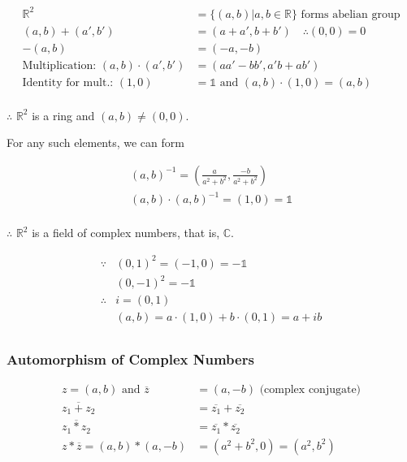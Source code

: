 \documentclass{article}
\begin{document}
    \begin{align*}
        \mathbb{R}^{2} &= \{ (a, b) | a, b \in \mathbb{R} \} \text{ forms abelian group} \\
        (a, b) + (a', b') &= (a + a', b + b') \quad \therefore (0, 0) = 0 \\
        -(a, b) &= (-a, -b) \\
        \text{Multiplication: } (a, b) \cdot (a', b') &= (aa' - bb', a'b + ab') \\
        \text{Identity for mult.: } (1, 0) &= \mathds{1} \text{ and } (a, b) \cdot (1, 0) = (a, b) \\
    \end{align*}
    
    $\therefore$ $\mathbb{R}^{2}$ is a ring and $(a, b) \neq (0, 0)$.
    
    For any such elements, we can form
    
    \begin{align*}
        (a, b)^{-1} = (\frac{a}{a^{2} + b^{2}}, \frac{-b}{a^{2} + b^{2}}) \\
        (a, b) \cdot (a, b)^{-1} = (1, 0) = \mathds{1} \\
    \end{align*}
    
    $\therefore$ $\mathbb{R}^{2}$ is a field of complex numbers, that is, $\mathbb{C}$.
    
    \begin{align*}
        \because & (0, 1)^{2} = (-1, 0) = \mathds{-1} \\
                      & (0, -1)^{2} = \mathds{-1} \\
        \therefore & i = (0, 1) \\
                        & (a, b) = a \cdot (1, 0) + b \cdot (0, 1) = a + ib \\
    \end{align*}
    
    \subsubsection{Automorphism of Complex Numbers}
    
    \begin{align*}
        z = (a, b) \text{ and } \overline{z} &= (a, -b) \text{ (complex conjugate)} \\
        \overline{z_{1} + z_{2}} &= \overline{z_{1}} + \overline{z_{2}} \\
        \overline{z_{1} * z_{2}} &= \overline{z_{1}} * \overline{z_{2}} \\
        z * \overline{z} = (a, b) * (a, -b) &= (a^{2} + b^{2}, 0) = (a^{2}, b^{2}) \\
    \end{align*}
    
\end{document}
